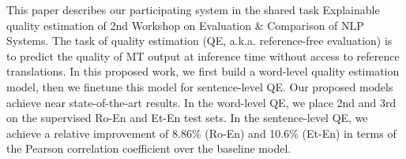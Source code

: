 This paper describes our participating system in the shared task Explainable quality estimation of 2nd Workshop on Evaluation \& Comparison of NLP Systems. The task of quality estimation (QE, a.k.a. reference-free evaluation) is to predict the quality of MT output at inference time without access to reference translations. In this proposed work, we first build a word-level quality estimation model, then we finetune this model for sentence-level QE. Our proposed models achieve near state-of-the-art results. In the word-level QE, we place 2nd and 3rd on the supervised Ro-En and Et-En test sets. In the sentence-level QE, we achieve a relative improvement of 8.86\% (Ro-En) and 10.6\% (Et-En) in terms of the Pearson correlation coefficient over the baseline model.
